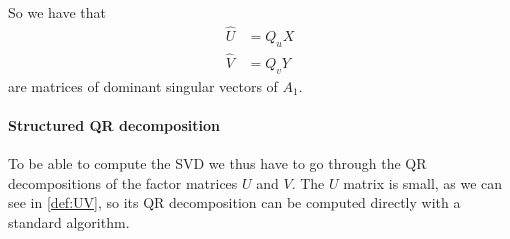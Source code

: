 So we have that
\begin{equation*}
  \begin{split}
    \hat{U} &= Q_u X\\
    \hat{V} &= Q_v Y
  \end{split}
\end{equation*}
are matrices of dominant singular vectors of $A_1$.

\paragraph{Structured QR decomposition}
To be able to compute the SVD we thus have to go through the QR decompositions of the factor matrices $U$ and $V$.
The $U$ matrix is small, as we can see in \ref{def:UV}, so its QR decomposition can be computed directly with a standard algorithm.

